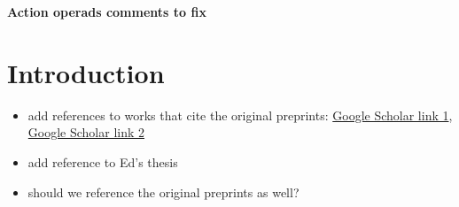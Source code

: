 \documentclass{amsart}
\begin{document}
\begin{center}
\begin{Large}
\textbf{Action operads comments to fix}
\end{Large}
\end{center}
\vskip1cm

\section{Introduction}
\begin{itemize}
\item add references to works that cite the original preprints: \href{https://scholar.google.com/scholar?oi=bibs\&hl=en\&cites=3135675589124701435}{Google Scholar link 1}, \href{https://scholar.google.com/scholar?oi=bibs&hl=en&cites=13749645182111219012&as_sdt=5}{Google Scholar link 2}
\item add reference to Ed's thesis
\item should we reference the original preprints as well?

\end{itemize}
\end{document}
